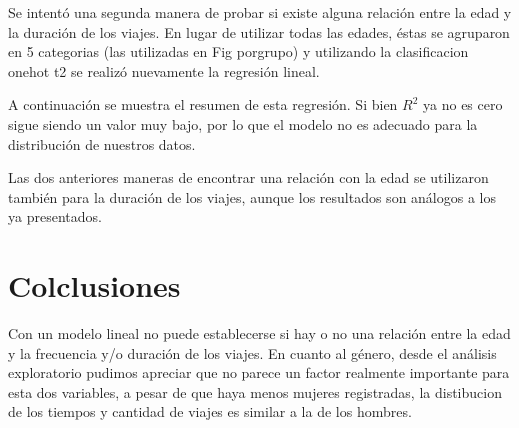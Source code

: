 \documentclass[letterpaper,spanish,reprint,nofootinbib,showkeys,aps]{revtex4-2}
\begin{document}


Se intentó una segunda manera de probar si existe alguna relación entre la edad y la duración de los viajes. 
En lugar de utilizar todas las edades, éstas se agruparon en 5 categorias (las utilizadas en Fig {porgrupo}) 
y utilizando la clasificacion onehot {t2} se realizó nuevamente la regresión lineal.


A continuación se muestra el resumen de esta regresión. Si bien $R^2$ ya no es cero sigue siendo un valor muy bajo,
por lo que el modelo no es adecuado para la distribución de nuestros datos.




Las dos anteriores maneras de encontrar una relación con la edad se utilizaron también para la duración de los viajes, 
aunque los resultados son análogos a los ya presentados.

\onecolumngrid

\section{Colclusiones}
Con un modelo lineal no puede establecerse si hay o no
una relación entre la edad y la frecuencia y/o duración de los viajes. En cuanto al género, desde el análisis exploratorio
pudimos apreciar que no parece un factor realmente importante para esta dos variables, a pesar de que haya menos mujeres
registradas, la distibucion de los tiempos y cantidad de viajes es similar a la de los hombres.

\onecolumngrid
\end{document}
